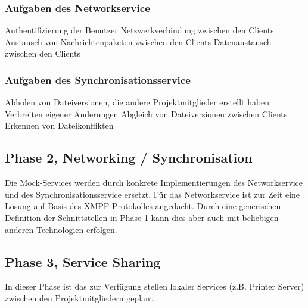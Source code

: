 \subsubsection{Aufgaben des Networkservice}
Authentifizierung der Benutzer
Netzwerkverbindung zwischen den Clients
Austausch von Nachrichtenpaketen zwischen den Clients
Datenaustausch zwischen den Clients

\subsubsection{Aufgaben des Synchronisationsservice}
Abholen von Dateiversionen, die andere Projektmitglieder erstellt haben
Verbreiten eigener Änderungen
Abgleich von Dateiversionen zwischen Clients
Erkennen von Dateikonflikten
\subsection{Phase 2, Networking / Synchronisation}
Die Mock-Services werden durch konkrete Implementierungen des Networkservice und des Synchronisationsservice ersetzt. Für das Networkservice ist zur Zeit eine Lösung auf Basis des XMPP-Protokolles angedacht. Durch eine generischen Definition der Schnittstellen in Phase 1 kann dies aber auch mit beliebigen anderen Technologien erfolgen.
\subsection{Phase 3, Service Sharing}
In dieser Phase ist das zur Verfügung stellen lokaler Services (z.B. Printer Server) zwischen den Projektmitgliedern geplant.




